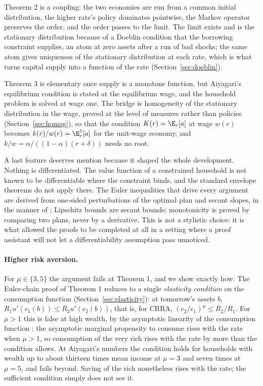 Theorem 2 is a coupling: the two economies are run from a common initial distribution, the higher
rate's policy dominates pointwise, the Markov operator preserves the order, and the order passes to
the limit. The limit exists and is the stationary distribution because of a Doeblin condition that
the borrowing constraint supplies, an atom at zero assets after a run of bad shocks; the same
atom gives uniqueness of the stationary distribution at each rate, which is what turns capital
supply into a function of the rate (Section~\ref{sec:doeblin}).

Theorem 3 is elementary once supply is a monotone function, but Aiyagari's equilibrium condition is
stated at the equilibrium wage, and the household problem is solved at wage one. The bridge is
homogeneity of the stationary distribution in the wage, proved at the level of measures rather than
policies (Section~\ref{sec:homog}), so that the condition $K(r)=\E_r[a]$ at wage $w(r)$ becomes
$k(r)/w(r)=\E^{1}_r[a]$ for the unit-wage economy, and $k/w=\alpha/((1-\alpha)(r+\delta))$ needs no
root.

A last feature deserves mention because it shaped the whole development. Nothing is differentiated.
The value function of a constrained household is not known to be differentiable where the
constraint binds, and the standard envelope theorems do not apply there. The Euler inequalities
that drive every argument are derived from one-sided perturbations of the optimal plan and secant
slopes, in the manner of \citet{ClausenStrub2020}; Lipschitz bounds are secant bounds; monotonicity
is proved by comparing two plans, never by a derivative. This is not a stylistic choice: it is what
allowed the proofs to be completed at all in a setting where a proof assistant will not let a
differentiability assumption pass unnoticed.

\paragraph{Higher risk aversion.}
For $\mu\in\{3,5\}$ the argument fails at Theorem 1, and we show exactly how. The Euler-chain proof
of Theorem 1 reduces to a single \emph{elasticity condition} on the consumption function
(Section~\ref{sec:elasticity}): at tomorrow's assets $b$,
$R_1u'(c_1(b))\le R_2u'(c_2(b))$, that is, for CRRA, $(c_2/c_1)^\mu\le R_2/R_1$. For $\mu>1$ this
is false at high wealth, by the asymptotic linearity of the consumption function
\citep{MaToda2022}: the asymptotic marginal propensity to consume rises with the rate when $\mu>1$,
so consumption of the very rich rises with the rate by more than the condition allows. At
Aiyagari's numbers the condition holds for households with wealth up to about thirteen times mean
income at $\mu=3$ and seven times at $\mu=5$, and fails beyond. Saving of the rich nonetheless
rises with the rate; the sufficient condition simply does not see it.

